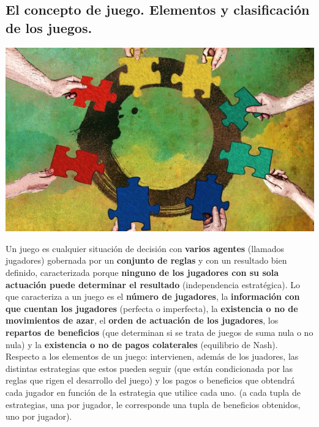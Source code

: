 \documentclass[a4paper, 11pt]{article}
\begin{document}
\subsection{El concepto de juego. Elementos y clasificación de los juegos.}
\includegraphics[width=\textwidth]{juegos.jpg} 

Un juego es cualquier situación de decisión con \textbf{varios agentes} (llamados jugadores) gobernada por un \textbf{conjunto de reglas} y con un resultado bien definido, caracterizada porque \textbf{ninguno de los jugadores con su sola actuación puede determinar el resultado} (independencia estratégica).
Lo que caracteriza a un juego es el \textbf{número de jugadores}, la \textbf{información con que cuentan los jugadores} (perfecta o imperfecta), la \textbf{existencia o no de movimientos de azar}, el \textbf{orden de actuación de los jugadores}, los \textbf{repartos de beneficios} (que determinan si se trata de juegos de suma nula o no nula) y la \textbf{existencia o no de pagos colaterales} (equilibrio de Nash). Respecto a los elementos de un juego: intervienen, además de los juadores, las distintas estrategias que estos pueden seguir (que están condicionada por las reglas que rigen el desarrollo del juego) y los pagos o beneficios que obtendrá cada jugador en función de la estrategia que utilice cada uno. (a cada tupla de estrategias, una por jugador, le corresponde una tupla de beneficios obtenidos, uno por jugador). 

\pagebreak
\end{document}
